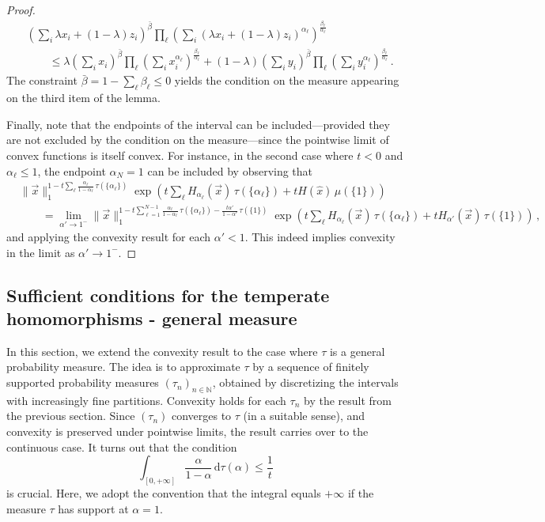 \documentclass[aps,pra,11pt,onecolumn,nofootinbib,tightenlines]{revtex4-2}
\theoremstyle{definition}
\def \d {\mathrm{d}}
\begin{document}
\begin{proof}
\begin{align}
    &\left(\sum_{i} \lambda x_i+(1-\lambda )z_i \right)^{\bar{\beta}} \prod_{\ell} \left(\sum_{i} (\lambda x_i+(1-\lambda ) z_i)^{\alpha_\ell} \right)^{\frac{\beta_\ell}{\alpha_\ell}} \\
    &\qquad \leq \lambda \left(\sum_{i} x_i \right)^{\bar{\beta}} \prod_{\ell} \left(\sum_{i} x_i^{\alpha_\ell} \right)^{\frac{\beta_\ell}{\alpha_\ell}} + (1-\lambda) \left(\sum_{i} y_i \right)^{\bar{\beta}} \prod_{\ell} \left(\sum_{i} y_i^{\alpha_\ell} \right)^{\frac{\beta_\ell}{\alpha_\ell}} \,.
\end{align}
The constraint $ \bar{\beta} =1-\sum_\ell\beta_\ell \leq 0$ yields the condition on the measure appearing on the third item of the lemma. 

\bigskip

Finally, note that the endpoints of the interval can be included—provided they are not excluded by the condition on the measure—since the pointwise limit of convex functions is itself convex. For instance, in the second case where $t < 0$ and $\alpha_\ell\leq 1$, the endpoint $\alpha_N = 1$ can be included by observing that
\begin{align}
   &\|\vec{x}\|_1^{1 - t\sum_\ell\frac{\alpha_\ell}{1-\alpha_\ell} \,\tau(\{\alpha_\ell\})} \exp\left( t\sum_\ell H_{\alpha_\ell}(\vec{x}) \,\tau(\{\alpha_\ell\}) + tH(\hat{x}) \,\mu(\{1\})\right)\\
   & \qquad = \lim_{\alpha' \rightarrow 1^-} \|\vec{x}\|_1^{1 - t\sum_{\ell=1}^{N-1}\frac{\alpha_\ell}{1-\alpha_\ell} \,\tau(\{\alpha_\ell\})-\frac{t\alpha'}{1-\alpha'} \,\tau(\{1\})} \exp\left( t\sum_\ell H_{\alpha_\ell}(\vec{x}) \,\tau(\{\alpha_\ell\}) 
    +tH_{\alpha'}(\vec{x}) \,\tau(\{1\})\right) \,,
\end{align}
and applying the convexity result for each $\alpha' < 1$. This indeed implies convexity in the limit as $\alpha' \to 1^-$.

\end{proof}

\subsection{Sufficient conditions for the temperate homomorphisms - general measure}
In this section, we extend the convexity result to the case where $\tau$ is a general probability measure. The idea is to approximate $\tau$ by a sequence of finitely supported probability measures $(\tau_n)_{n \in \mathbb{N}}$, obtained by discretizing the intervals with increasingly fine partitions. Convexity holds for each $\tau_n$ by the result from the previous section. Since $(\tau_n)$ converges to $\tau$ (in a suitable sense), and convexity is preserved under pointwise limits, the result carries over to the continuous case. It turns out that the condition
\begin{equation}\label{eq:IntegralCond}
\int_{[0,+\infty]}\frac{\alpha}{1-\alpha}\,\d\tau(\alpha)\leq\frac{1}{t}
\end{equation}
is crucial.  Here, we adopt the convention that the integral equals $+\infty$ if the measure $\tau$ has support at \(\alpha = 1\).
\end{document}
